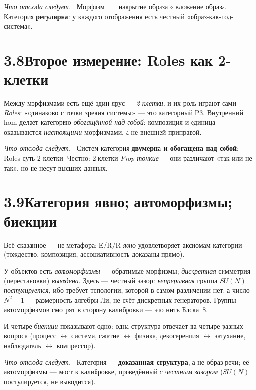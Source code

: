 \documentclass[12pt,a4paper]{article}
\newcommand{\rezultat}{\medskip\noindent\emph{Что отсюда следует.}\ }
\begin{document}
\rezultat
Морфизм $=$ накрытие образа $\circ$ вложение образа. Категория \textbf{регулярна}: у каждого
отображения есть честный «образ-как-под-система».

\section*{3.8\quad Второе измерение: Roles как 2-клетки}

Между морфизмами есть ещё один ярус --- \emph{2-клетки}, и их роль играют сами \emph{Roles}:
«одинаково с точки зрения системы» --- это категорный P3. Внутренний hom делает категорию
\emph{обогащённой над собой}: композиция и единица оказываются \emph{настоящими} морфизмами, а не
внешней приправой.

\rezultat
Систем-категория \textbf{двумерна и обогащена над собой}: Roles суть 2-клетки. Честно: 2-клетки
\emph{Prop-тонкие} --- они различают «так или не так», но не несут высших данных.

\section*{3.9\quad Категория явно; автоморфизмы; биекции}

Всё сказанное --- не метафора: E/R/R \emph{явно} удовлетворяет аксиомам категории (тождество,
композиция, ассоциативность доказаны прямо).

У объектов есть \emph{автоморфизмы} --- обратимые морфизмы; \emph{дискретная} симметрия (перестановки)
\emph{выведена}. Здесь --- честный зазор: \emph{непрерывная} группа $SU(N)$ \emph{постулируется}, ибо
требует топологии, которой в самом различении нет; а число $N^2-1$ --- размерность алгебры Ли, не
счёт дискретных генераторов. Группы автоморфизмов смотрят в сторону калибровки --- это нить Блока~8.

И четыре \emph{биекции} показывают одно: одна структура отвечает на четыре разных вопроса
(процесс $\leftrightarrow$ система, сжатие $\leftrightarrow$ физика,
декогеренция $\leftrightarrow$ затухание, наблюдатель $\leftrightarrow$ компрессор).

\rezultat
Категория --- \textbf{доказанная структура}, а не образ речи; её автоморфизмы --- мост к калибровке,
проведённый \emph{с честным зазором} ($SU(N)$ постулируется, не выводится).
\end{document}

